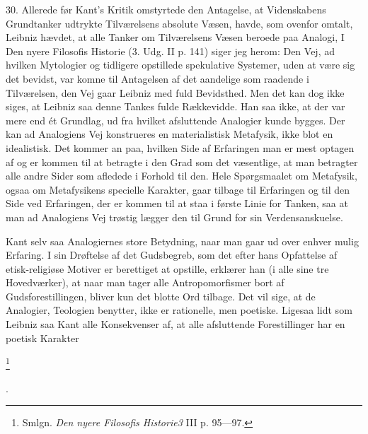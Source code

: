 \documentclass[12pt]{article}
\newcommand{\apage}[1]{\marginnote{\footnotesize\textit{[#1]}}}
\begin{document}
30. Allerede før Kant's Kritik omstyrtede den Antagelse, at Videnskabens
Grundtanker udtrykte Tilværelsens absolute Væsen, havde, som ovenfor omtalt,
Leibniz hævdet, at alle Tanker om Tilværelsens Væsen beroede paa Analogi, I
\guillemotright{}Den nyere Filosofis Historie\guillemotleft{} (3. Udg. II p.
141) siger jeg herom: \guillemotright{}Den Vej, ad hvilken Mytologier og
tidligere opstillede spekulative Systemer, uden at være sig det bevidst, var
komne til Antagelsen af det aandelige som raadende i Tilværelsen, den Vej gaar
Leibniz med fuld Bevidsthed.\guillemotleft{} Men det kan dog ikke siges, at
Leibniz saa denne Tankes fulde Rækkevidde. Han saa ikke, at der var mere end ét
Grundlag, ud fra hvilket afsluttende Analogier kunde bygges. Der kan ad
Analogiens Vej konstrueres en materialistisk Metafysik, ikke blot en
idealistisk. Det kommer an paa, hvilken Side af Erfaringen man er mest optagen
af og er kommen til at betragte i den Grad som det væsentlige, at man betragter
alle andre Sider som afledede i Forhold til den. Hele Spørgsmaalet om
Metafysik, ogsaa om Metafysikens specielle Karakter, gaar tilbage til
Erfaringen og til den Side ved Erfaringen, der er kommen til at staa i første
Linie for Tanken, saa at man ad Analogiens Vej trøstig lægger den til Grund for
sin Verdensanskuelse.

\setcounter{footnote}{0}%
\apage{97}Kant selv saa Analogiernes store Betydning, naar man gaar ud over
enhver mulig Erfaring. I sin Drøftelse af det Gudsbegreb, som det efter hans
Opfattelse af etisk-religiøse Motiver er berettiget at opstille, erklærer han
(i alle sine tre Hovedværker), at naar man tager alle Antropomorfismer bort af
Gudsforestillingen, bliver kun det blotte Ord tilbage. Det vil sige, at de
Analogier, Teologien benytter, ikke er rationelle, men poetiske. Ligesaa lidt
som Leibniz saa Kant alle Konsekvenser af, at alle afsluttende Forestillinger
har en poetisk Karakter

         \footnote{Smlgn. \textit{Den nyere Filosofis Historie3 }III p. 95---97.}

      .
\end{document}
